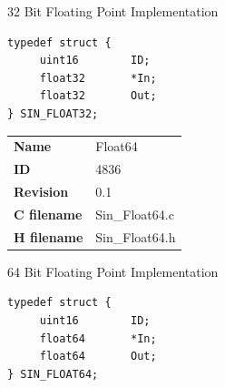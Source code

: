32 Bit Floating Point Implementation

\begin{lstlisting}
typedef struct {
     uint16        ID;
     float32       *In;
     float32       Out;
} SIN_FLOAT32;
\end{lstlisting}

\ifdefined \AddTestReports
{}
\fi
{}
\nopagebreak[0]
\begin{tabular}{l l}
\textbf{Name} & Float64 \tabularnewline
\textbf{ID} & 4836 \tabularnewline
\textbf{Revision} & 0.1 \tabularnewline
\textbf{C filename} & Sin\_Float64.c \tabularnewline
\textbf{H filename} & Sin\_Float64.h \tabularnewline
\end{tabular}
\vspace{1ex}

64 Bit Floating Point Implementation

\begin{lstlisting}
typedef struct {
     uint16        ID;
     float64       *In;
     float64       Out;
} SIN_FLOAT64;
\end{lstlisting}

\ifdefined \AddTestReports
{}
\fi
